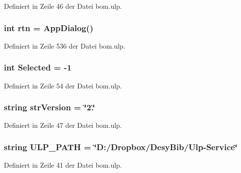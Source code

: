 Definiert in Zeile 46 der Datei bom.\+ulp.

\hypertarget{bom_8ulp_a2b671bc2490402c9747f8ee3e399b13d}{}
\subsubsection[{rtn}]{\setlength{\rightskip}{0pt plus 5cm}int rtn = {\bf App\+Dialog}()}\label{bom_8ulp_a2b671bc2490402c9747f8ee3e399b13d}


Definiert in Zeile 536 der Datei bom.\+ulp.

\hypertarget{bom_8ulp_aa63c48313853c05d2e5b345772063942}{}
\subsubsection[{Selected}]{\setlength{\rightskip}{0pt plus 5cm}int Selected = -\/1}\label{bom_8ulp_aa63c48313853c05d2e5b345772063942}


Definiert in Zeile 54 der Datei bom.\+ulp.

\hypertarget{bom_8ulp_a18a4ac3bd1cb918f565f779006ee77ba}{}
\subsubsection[{str\+Version}]{\setlength{\rightskip}{0pt plus 5cm}string str\+Version = \char`\"{}2.\char`\"{}}\label{bom_8ulp_a18a4ac3bd1cb918f565f779006ee77ba}


Definiert in Zeile 47 der Datei bom.\+ulp.

\hypertarget{bom_8ulp_abf922ed4825a62eb9f0838b10265fc5b}{}
\subsubsection[{U\+L\+P\+\_\+\+P\+A\+T\+H}]{\setlength{\rightskip}{0pt plus 5cm}string U\+L\+P\+\_\+\+P\+A\+T\+H = \char`\"{}D\+:/Dropbox/Desy\+Bib/Ulp-\/Service\char`\"{}}\label{bom_8ulp_abf922ed4825a62eb9f0838b10265fc5b}


Definiert in Zeile 41 der Datei bom.\+ulp.

\hypertarget{bom_8ulp_a5b14b1eeb65e50d10a438760f173f2e9}{}
